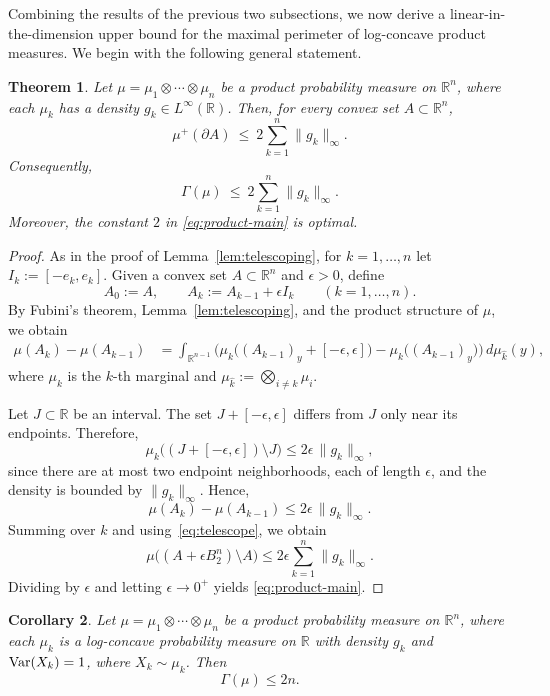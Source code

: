 \documentclass[11pt,leqno]{article}
\newtheorem{theorem}{Theorem}[section]
\newtheorem{corollary}[theorem]{Corollary}
\theoremstyle{remark}
\numberwithin{equation}{section}
\newcommand{\ls}{\leqslant}
\begin{document}
\medskip 

 Combining the results of the previous two subsections, we now derive a linear-in-the-dimension 
upper bound for the maximal perimeter of log-concave product measures. We begin with the following general statement.

\begin{theorem}\label{thm:product-sharp}
Let $\mu=\mu_1\otimes\cdots\otimes\mu_n$ be a product probability measure on $\mathbb{R}^n$,
where each $\mu_k$ has a density $g_k\in L^\infty(\mathbb{R})$. Then, for every convex set $A\subset\mathbb{R}^n$,
\begin{equation}\label{eq:product-main}\mu^{+}(\partial A)\ \ls\ 2\sum_{k=1}^n \|g_k\|_\infty.\end{equation}
Consequently,
$$\Gamma(\mu)\ \ls\ 2\sum_{k=1}^n \|g_k\|_\infty.$$
Moreover, the constant $2$ in \eqref{eq:product-main} is optimal.
\end{theorem}

\begin{proof}As in the proof of Lemma~\ref{lem:telescoping}, for $k=1,\dots,n$ let $I_k:= [-e_k,e_k]$. Given a  
convex set $A\subset\mathbb{R}^n$ and $\epsilon>0$, define
$$A_0:=A,\qquad A_k:=A_{k-1}+\epsilon I_k\qquad(k=1,\dots,n).$$
By Fubini's theorem, Lemma~\ref{lem:telescoping}, and the product structure of $\mu$, we obtain 
\begin{align*}
\mu(A_k)-\mu(A_{k-1})
&=\int_{\mathbb{R}^{n-1}}\Big(\mu_k\big((A_{k-1})_y+[-\epsilon,\epsilon]\big)-\mu_k\big((A_{k-1})_y\big)\Big)\,d\mu_{\widehat{k}}(y),
\end{align*}
where $\mu_k$ is the $k$-th marginal and $\mu_{\widehat{k}}:=\bigotimes_{i\neq k}\mu_i$.

Let $J\subset\mathbb{R}$ be an interval. The set $J+[-\epsilon,\epsilon]$ differs from $J$ only near its endpoints.
Therefore,
$$\mu_k\big((J+[-\epsilon,\epsilon])\setminus J\big)\ls 2\epsilon\,\|g_k\|_\infty,$$
since there are at most two endpoint neighborhoods, each of length $\epsilon$,
and the density is bounded by $\|g_k\|_\infty$. Hence,
$$\mu(A_k)-\mu(A_{k-1})\ls 2\epsilon\,\|g_k\|_\infty.$$
Summing over $k$ and using~\eqref{eq:telescope}, we obtain 
$$\mu\big((A+\epsilon B_2^n)\setminus A\big)\ls 2\epsilon \sum_{k=1}^n \|g_k\|_\infty.$$
Dividing by $\epsilon$ and letting $\epsilon\to 0^+$ yields \eqref{eq:product-main}.
\end{proof}

\begin{corollary}\label{cor:isotropic-product}
Let $\mu=\mu_1\otimes\cdots\otimes\mu_n$ be a product probability measure on $\mathbb{R}^n$, where each $\mu_k$ is a log-concave probability measure on $\mathbb{R}$ 
with density $g_k$ and ${\rm Var}(X_k)=1$, where $X_k\sim\mu_k$. Then
$$\Gamma(\mu)\ls 2n.$$
\end{corollary}
\end{document}
